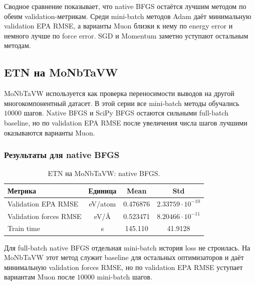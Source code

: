 
Сводное сравнение показывает, что native BFGS остаётся лучшим методом по обеим validation-метрикам. Среди mini-batch методов Adam даёт минимальную validation EPA RMSE, а варианты Muon близки к нему по energy error и немного лучше по force error. SGD и Momentum заметно уступают остальным методам.

\FloatBarrier

\subsection{ETN на MoNbTaVW}
\label{subsec:etn-monbtavw-results}

MoNbTaVW используется как проверка переносимости выводов на другой многокомпонентный датасет. В этой серии все mini-batch методы обучались \(10000\) шагов. Native BFGS и SciPy BFGS остаются сильными full-batch baseline, но по validation EPA RMSE после увеличения числа шагов лучшими оказываются варианты Muon.

\subsubsection{Результаты для native BFGS}

\begin{table}[H]
\centering
\small
\caption{ETN на MoNbTaVW: native BFGS.}
\label{tab:etn-monbtavw-native-bfgs}
\begin{tabular}{lccc}
\toprule
Метрика & Единица & Mean & Std \\
\midrule
Validation EPA RMSE & eV/atom & 0.476876 & \(2.33759\cdot 10^{-10}\) \\
Validation forces RMSE & eV/\AA & 0.523471 & \(8.20466\cdot 10^{-11}\) \\
Train time & s & 145.110 & 41.9128 \\
\bottomrule
\end{tabular}
\end{table}

Для full-batch native BFGS отдельная mini-batch история loss не строилась. На MoNbTaVW этот метод служит baseline для остальных оптимизаторов и даёт минимальную validation forces RMSE, но по validation EPA RMSE уступает вариантам Muon после \(10000\) mini-batch шагов.

